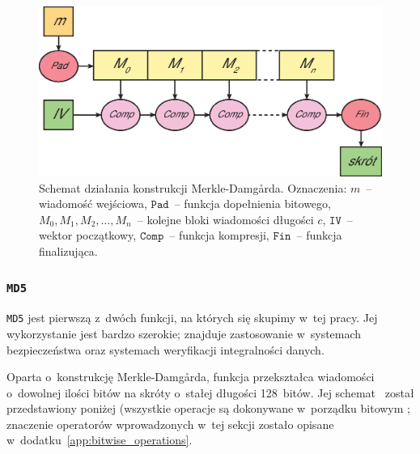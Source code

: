 \documentclass[12pt,a4paper,twoside]{article}
\begin{document}
\begin{figure}[H]
    \includegraphics[width=12cm]{img/merkle_damgard.eps}
    \caption{Schemat działania konstrukcji Merkle-Damg\r{a}rda. Oznaczenia:
    $m$~-- wiadomość wejściowa, $\mathtt{Pad}$~-- funkcja dopełnienia bitowego,
    $M_0, M_1, M_2, \ldots, M_n$~-- kolejne bloki wiadomości długości $c$,
    $\mathtt{IV}$~-- wektor początkowy, $\mathtt{Comp}$~-- funkcja kompresji,
    $\mathtt{Fin}$~-- funkcja finalizująca.}
    \label{fig:merkle_damgard}
\end{figure}



\subsubsection{\texttt{MD5}}
\texttt{MD5} jest pierwszą z~dwóch funkcji, na których się skupimy w~tej pracy.
Jej wykorzystanie jest bardzo szerokie; znajduje zastosowanie w~systemach
bezpieczeństwa oraz systemach weryfikacji integralności danych.

Oparta o~konstrukcję Merkle-Damg\r{a}rda, funkcja przekształca wiadomości
o~dowolnej ilości bitów na skróty o~stałej długości 128~bitów. Jej
schemat~\cite{md5_definition} został przedstawiony poniżej (wszystkie operacje
są dokonywane w~porządku bitowym ; znaczenie operatorów
wprowadzonych w~tej sekcji zostało opisane
w~dodatku~\ref{app:bitwise_operations}.
\end{document}
